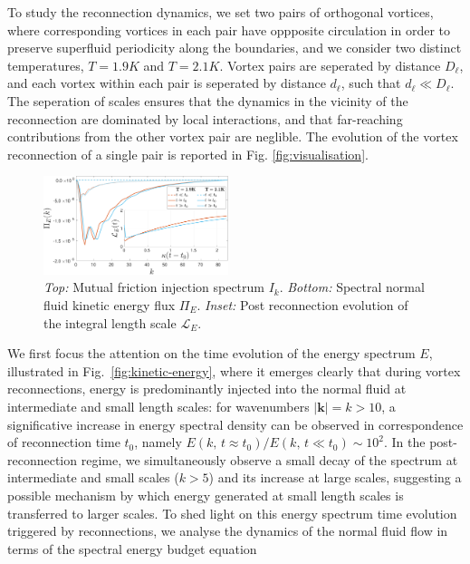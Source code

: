\documentclass[%
 reprint,
 amsmath,amssymb,
 aps,
 prl,
]{revtex4-2}
\begin{document}
{To study the reconnection dynamics, we set two pairs of orthogonal vortices, where corresponding vortices in each pair have oppposite circulation in order to preserve superfluid periodicity along the boundaries, and we consider two distinct temperatures, $T=1.9K$ and $T=2.1K$. Vortex pairs are seperated by distance $D_{\ell}$, and each vortex within each pair is seperated by distance $d_{\ell}$, such that $d_{\ell}\ll D_{\ell}$. The seperation of scales ensures that the dynamics in the vicinity of the reconnection are dominated by local interactions, and that far-reaching contributions from the other vortex pair are neglible. The evolution of the vortex reconnection of a single pair is reported in Fig. \ref{fig:visualisation}. 
\begin{figure}[t]
    \centering
    \includegraphics*[width=0.48\textwidth]{flux-spec.pdf}
\caption{\emph{Top:} Mutual friction injection spectrum $I_k$. \emph{Bottom:} Spectral normal fluid kinetic energy flux $\Pi_E$. \emph{Inset:} Post reconnection evolution of the integral length scale $\mathcal{L}_E$.}
\label{fig:energy-flux}
\end{figure}

We first focus the attention on the time evolution of the energy spectrum $E$, illustrated in Fig.~\ref{fig:kinetic-energy}, where it emerges clearly that  
during vortex reconnections, energy is predominantly injected into the normal fluid at intermediate and small length scales: 
for wavenumbers $|\mathbf{k}| = k>10$, a significative increase in energy spectral density can be observed in correspondence of reconnection time $t_0$, 
namely $E(k,\, t\approx t_0)/E(k,\, t\ll t_0)\sim 10^2$. In the post-reconnection regime, we simultaneously observe a small decay of the spectrum at intermediate 
and small scales ($k > 5$) and its increase at large scales, suggesting a possible mechanism by 
which energy generated at small length scales is transferred to larger scales. To shed light on this energy spectrum time evolution triggered by reconnections,
we analyse the dynamics of the normal fluid flow in terms of the spectral energy budget equation 

}
\end{document}
